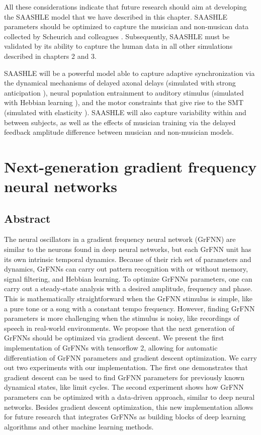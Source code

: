 \documentclass{report}
\begin{document}
All these considerations indicate that future research should aim at developing the SAASHLE model that we have described in this chapter. SAASHLE parameters should be optimized to capture the musician and non-musican data collected by Scheurich and colleagues \cite{scheurich2018tapping}. Subsequently, SAASHLE must be validated by its ability to capture the human data in all other simulations described in chapters 2 and 3. 

SAASHLE will be a powerful model able to capture adaptive synchronization via the dynamical mechanisms of delayed axonal delays (simulated with strong anticipation \cite{stepp2010strong}), neural population entrainment to auditory stimulus (simulated with Hebbian learning \cite{righetti2006dynamic}), and the motor constraints that give rise to the SMT (simulated with elasticity \cite{lambert2016adaptive}). SAASHLE will also capture variability within and between subjects, as well as the effects of musician training via the delayed feedback amplitude difference between musician and non-musician models. 


\chapter{Next-generation gradient frequency neural networks}

\section{Abstract}
The neural oscillators in a gradient frequency neural network (GrFNN) are similar to the neurons found in deep neural networks, but each GrFNN unit has its own intrinsic temporal dynamics. Because of their rich set of parameters and dynamics, GrFNNs can carry out pattern recognition with or without memory, signal filtering, and Hebbian learning. To optimize GrFNNs parameters, one can carry out a steady-state analysis with a desired amplitude, frequency and phase. This is mathematically straightforward when the GrFNN stimulus is simple, like a pure tone or a song with a constant tempo frequency. However, finding GrFNN parameters is more challenging when the stimulus is noisy, like recordings of speech in real-world environments. We propose that the next generation of GrFNNs should be optimized via gradient descent. We present the first implementation of GrFNNs with tensorflow 2, allowing for automatic differentiation of GrFNN parameters and gradient descent optimization. We carry out two experiments with our implementation. The first one demonstrates that gradient descent can be used to find GrFNN parameters for previously known dynamical states, like limit cycles. The second experiment shows how GrFNN parameters can be optimized with a data-driven approach, similar to deep neural networks. Besides gradient descent optimization, this new implementation allows for future research that integrates GrFNNs as building blocks of deep learning algorithms and other machine learning methods.
\end{document}
